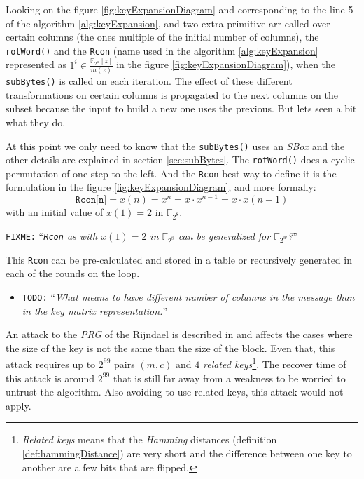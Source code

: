\documentclass[10pt,a4paper,twoside]{llncs}
\newcommand{\todo}[1]{\texttt{\color{red}TODO:} ``\emph{#1}''}
\newcommand{\fixme}[1]{\texttt{\color{red}FIXME:} ``\emph{#1}''}
\newcommand{\Fpn}[2]{\ensuremath{\mathbb{F}_{#1^#2}}}
\begin{document}
Looking on the figure \ref{fig:keyExpansionDiagram} and corresponding to the line 5 of the algorithm \ref{alg:keyExpansion}, and two extra primitive arr called over certain columns (the ones multiple of the initial number of columns), the {\tt rotWord()} and the {\tt Rcon} (name used in the algorithm \ref{alg:keyExpansion} represented as $1^{i} \in\frac{\mathbb{F}_{2^{w}}[z]}{m(z)}$ in the figure \ref{fig:keyExpansionDiagram}), when the {\tt subBytes()} is called on each iteration. The effect of these different transformations on certain columns is propagated to the next columns on the subset because the input to build a new one uses the previous. But lets seen a bit what they do.

At this point we only need to know that the {\tt subBytes()} uses an \emph{SBox} and the other details are explained in section \ref{sec:subBytes}. The {\tt rotWord()} does a cyclic permutation of one step to the left. And the {\tt Rcon} best way to define it is the formulation in the figure \ref{fig:keyExpansionDiagram}, and more formally:
\begin{equation}\label{eq:rcon}
    \texttt{Rcon[n]} = x(n) = x^n = x\cdot x^{n-1}=x\cdot x(n-1)
\end{equation}
with an initial value of $x(1)=2$ in \Fpn{2}{8}.

\fixme{{\tt Rcon} as with $x(1)=2$ in \Fpn{2}{8} can be generalized for \Fpn{2}{w}?}

This {\tt Rcon} can be pre-calculated and stored in a table or recursively generated in each of the rounds on the loop.

\begin{itemize}
 \item \todo{What means to have different number of columns in the message than in the key matrix representation.}
\end{itemize}

An attack to the \emph{PRG} of the Rijndael is described in \cite{fullaes-192-256} and affects the cases where the size of the key is not the same than the size of the block. Even that, this attack requires up to $2^{99}$ pairs $(m,c)$ and $4$ \emph{related keys}\footnote{\emph{Related keys} means that the \emph{Hamming} distances (definition \ref{def:hammingDistance}) are very short and the difference between one key to another are a few bits that are flipped.}. The recover time of this attack is around $2^{99}$ that is still far away from a weakness to be worried to untrust the algorithm. Also avoiding to use related keys, this attack would not apply.
\end{document}

